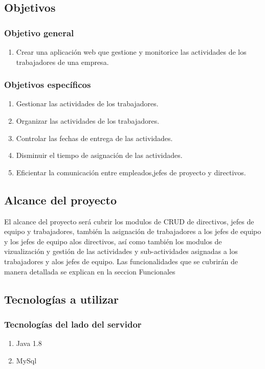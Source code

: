 \documentclass[11pt,a4paper]{article}
\begin{document}
\subsection {Objetivos}
\subsubsection { Objetivo general}
\begin{enumerate}
\item Crear una aplicación web que gestione y monitorice las actividades de los trabajadores de una empresa.
\end{enumerate}
\subsubsection {Objetivos específicos}
\begin{enumerate}
\item Gestionar las actividades de los trabajadores.
\item Organizar las actividades de los trabajadores.
\item Controlar las fechas de entrega de las actividades.
\item Disminuir el tiempo de asignación de las actividades. 
\item Eficientar la comunicación entre empleados,jefes de proyecto y directivos.
\end{enumerate}

\subsection {Alcance del proyecto}
El alcance del proyecto será cubrir los modulos de CRUD de directivos, jefes de equipo y trabajadores, también la asignación de trabajadores a los jefes de equipo y los jefes de equipo alos directivos, así como también los modulos de vizualización y gestión de las actividades y sub-actividades asignadas a los trabajadores y alos jefes de equipo. Las funcionalidades que se cubrirán de manera detallada se explican en la seccion Funcionales

\subsection{Tecnologías a utilizar}
\subsubsection{Tecnologías del lado del servidor}
\begin{enumerate}
\item Java 1.8
\item MySql
\end{enumerate}
\end{document}
